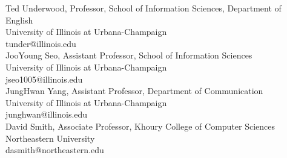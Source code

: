 \documentclass{article}
\begin{document}
\noindent Ted Underwood, Professor, School of Information Sciences, Department of English \\
University of Illinois at Urbana-Champaign \\
tunder@illinois.edu \\

\noindent JooYoung Seo, Assistant Professor, School of Information Sciences \\
University of Illinois at Urbana-Champaign \\
jseo1005@illinois.edu \\

\noindent JungHwan Yang, Assistant Professor, Department of Communication \\
University of Illinois at Urbana-Champaign \\
junghwan@illinois.edu \\

\noindent David Smith, Associate Professor, Khoury College of Computer Sciences \\
Northeastern University \\
dasmith@northeastern.edu \\
\end{document}
